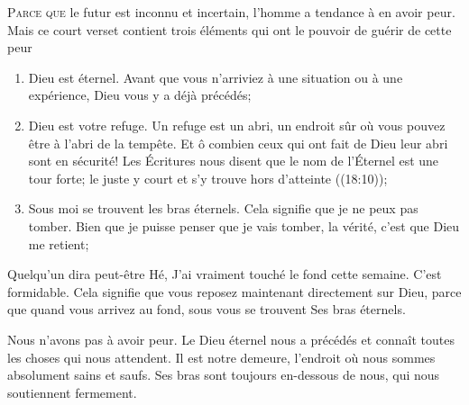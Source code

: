 \dvrule







\lettrine{P}{arce que} le futur est inconnu et incertain,
 l'homme a tendance à en avoir peur. Mais ce court verset
 contient trois éléments qui ont le pouvoir de guérir de cette peur\frcolon{}

\begin{enumerate}
  \item Dieu est éternel. Avant que vous n'arriviez à une situation
   ou à une expérience, Dieu vous y a déjà précédés;
  \item Dieu est votre refuge. Un refuge est un abri,
   un endroit sûr où vous pouvez être à l'abri de la tempête.
   Et ô combien ceux qui ont fait de Dieu leur abri sont en sécurité!
   Les Écritures nous disent que le nom de l'Éternel est une tour forte;
   le juste y court et s'y trouve hors d'atteinte ((18:10));
  \item Sous moi se trouvent les bras éternels.
   Cela signifie que je ne peux pas tomber.
   Bien que je puisse penser que je vais tomber,
   la vérité, c'est que Dieu me retient;
\end{enumerate}


Quelqu'un dira peut-être\frcolon{}
 \Og Hé, J'ai vraiment touché le fond cette semaine. \Fg{}
 C'est formidable. Cela signifie que vous reposez maintenant
 directement sur Dieu, parce que quand vous arrivez au fond,
 sous vous se trouvent Ses bras éternels.

Nous n'avons pas à avoir peur.
 Le Dieu éternel nous a précédés et connaît toutes les choses
 qui nous attendent. Il est notre demeure,
 l'endroit où nous sommes absolument sains et saufs.
 Ses bras sont toujours en-dessous de nous, qui nous soutiennent fermement. 

